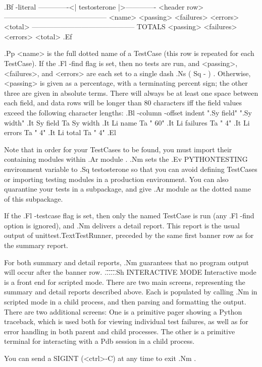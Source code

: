 .Bf -literal
    -------------<| testosterone |>-------------
    <header row>
    --------------------------------------------
    <name> <passing> <failures> <errors> <total>
    --------------------------------------------
    TOTALS <passing> <failures> <errors> <total>
.Ef

.Pp
<name> is the full dotted name of a TestCase (this row is repeated for each
TestCase). If the
.Fl -find
flag is set, then no tests are run, and <passing>, <failures>, and <errors> are
each set to a single dash
.Ns ( Sq - ) .
Otherwise, <passing> is given as a percentage, with a terminating percent sign;
the other three are given in absolute terms. There will always be at least one
space between each field, and data rows will be longer than 80 characters iff
the field values exceed the following character lengths:
.Bl -column -offset indent ".Sy field" ".Sy width"
.It Sy field Ta Sy width
.It Li name Ta "  60"
.It Li failures Ta "   4"
.It Li errors Ta "   4"
.It Li total Ta "   4"
.El

Note that in order for your TestCases to be found, you must import their
containing modules within
.Ar module .
.Nm
sets the
.Ev PYTHONTESTING
environment variable to
.Sq testosterone
so that you can avoid defining TestCases or importing testing modules in a
production environment. You can also quarantine your tests in a subpackage, and
give
.Ar module
as the dotted name of this subpackage.

If the
.Fl -testcase
flag is set, then only the named TestCase is run (any
.Fl -find
option is ignored), and
.Nm
delivers a detail report. This report is the usual output of
unittest.TextTestRunner, preceded by the same first banner row as for the
summary report.

For both summary and detail reports,
.Nm
guarantees that no program output will occur after the banner row.
.\"
.\"
.\"
.\"
.\"
.Sh INTERACTIVE MODE
Interactive mode is a front end for scripted mode. There are two main screens,
representing the summary and detail reports described above. Each is populated
by calling
.Nm
in scripted mode in a child process, and then parsing and formatting the output.
There are two additional screens: One is a primitive pager showing a Python
traceback, which is used both for viewing individual test failures, as well as
for error handling in both parent and child processes. The other is a primitive
terminal for interacting with a Pdb session in a child process.

You can send a SIGINT (<ctrl>-C) at any time to exit
.Nm .



